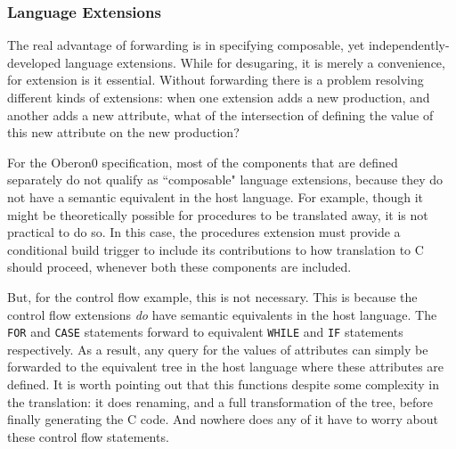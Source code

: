\begin{comment}
\emph{To complete.}
\begin{itemize}

\item HOA used to create new, transformed, trees.

\item Two transformation merged into one pass in Oberon: renaming, and lambda lifting.

\item Renaming just threads a list of used names through the whole tree, and the
      resulting transformed tree just uses the reference attribute to find out the
      new name.

\item Lambda lifting moves all non-var declarations up to the
      top-level, in preparation for code generation.

\end{itemize}
\end{comment}

\subsubsection{Language Extensions}

The real advantage of forwarding is in specifying composable, yet
independently-developed language extensions.
%
While for desugaring, it is merely a convenience, for extension is it essential.
%
Without forwarding there is a problem resolving different kinds of extensions:
when one extension adds a new production, and another adds a new attribute,
what of the intersection of defining the value of this new attribute on the
new production?

For the Oberon0 specification, most of the components that are defined separately do
not qualify as ``composable" language extensions, because they do not have a
semantic equivalent in the host language.
%
For example, though it might be theoretically possible for procedures to
be translated away, it is not practical to do so.
%
In this case, the procedures extension must provide a conditional build trigger
to include its contributions to how translation to C should proceed, whenever both
these components are included.

But, for the control flow example, this is not necessary.
%
This is because the control flow extensions \textit{do} have semantic
equivalents in the host language.
%
The \texttt{FOR} and \texttt{CASE} statements forward to equivalent
\texttt{WHILE} and \texttt{IF} statements respectively.
%
As a result, any query for the values of attributes can simply be forwarded to
the equivalent tree in the host language where these attributes are defined.
%
It is worth pointing out that this functions despite some complexity in the
translation: it does renaming, and a full transformation of the tree, before
finally generating the C code.
%
And nowhere does any of it have to worry about these control flow statements.

